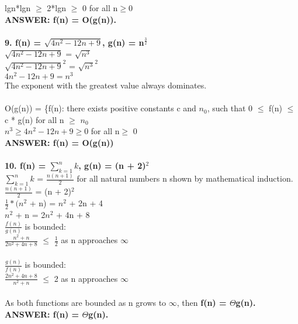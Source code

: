 \documentclass[fleqn]{article}
\begin{document}
lgn*lgn $\ge$ 2*lgn $\ge$ 0 for all n$\ge$0\\
\textbf{ANSWER: f(n) = O(g(n)).}\\\\
\textbf{9. f(n) = $\sqrt{4n^{2} - 12 n + 9}$, g(n) =  n$^{\frac{3}{2}}$}\\
$\sqrt{4n^{2} - 12 n + 9}$ = $\sqrt{n^{3}}$\\
$\sqrt{4n^{2} - 12 n + 9}^{2}$ = $\sqrt{n^{3}}^{2}$\\
$4n^{2} - 12 n + 9 = n^{3}$\\
The exponent with the greatest value always dominates.\\\\
O(g(n)) = \{f(n): there exists positive constants c and  $n_{0}$, such that 0 $\le$ f(n) $\le$ c * g(n) for all n $\ge$ $n_{0}$\\
$n^{3} \ge 4n^{2} - 12 n + 9 \ge $0 for all n$ \ge$ 0\\ 
\textbf{ANSWER: f(n) = O(g(n))}\\\\
\textbf{10. f(n) = $\sum\nolimits_{k=1}^n k$, g(n) = (n + 2)$^{2}$}\\
$\sum\nolimits_{k=1}^n k$ = $\frac{n(n+1)}{2}$ for all natural numbers n shown by mathematical induction.\\
$\frac{n(n+1)}{2}$ = (n + 2)$^{2}$\\
$\frac{1}{2} * (n^{2}$ + n) =  $n^{2}$ + 2n + 4\\
$n^{2}$ + n =  2$n^{2}$ + 4n + 8\\
$\frac{f(n)}{g(n)}$ is bounded:\\
$\frac{n^{2} + n}{2n^{2} + 4n + 8}$ $\le$ $\frac{1}{2}$ as n approaches $\infty$ \\\\
$\frac{g(n)}{f(n)}$ is bounded:\\
$\frac{2n^{2} + 4n + 8}{n^{2} + n}$ $\le$ 2 as n approaches $\infty$ \\\\
As both functions are bounded as n grows to $\infty$, then \textbf{f(n) = $\Theta$g(n).}\\
\textbf{ANSWER: f(n) = $\Theta$g(n).}\\\\
\end{document}
